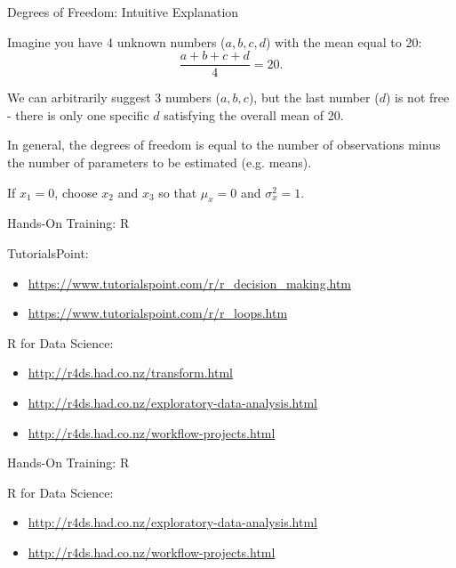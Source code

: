 \begin{frame}{Degrees of Freedom: Intuitive Explanation}
   
    Imagine you have 4 unknown numbers ($a , b , c , d$) with the mean equal to 20:
    \begin{equation*}
    \frac{a + b + c + d}{4} = 20.
    \end{equation*}
    
    We can arbitrarily suggest 3 numbers ($a, b, c$), but the last number ($d$) is not free - there is only one specific $d$ satisfying the overall mean of 20.
    
    In general, the degrees of freedom is equal to the number of observations minus the number of parameters to be estimated (e.g. means).
    
    \begin{example}
        \medskip
        If $x_1 = 0$, choose $x_2$ and $x_3$ so that $\mu_{x} = 0$ and $\sigma^2_{x} = 1$.
    \end{example}
    
\end{frame}

\begin{frame}{Hands-On Training: R}
    
    TutorialsPoint:
    \begin{itemize}
        \item \url{https://www.tutorialspoint.com/r/r_decision_making.htm}
        \item \url{https://www.tutorialspoint.com/r/r_loops.htm}
    \end{itemize}

    R for Data Science:
    \begin{itemize}
        \item \url{http://r4ds.had.co.nz/transform.html}
    \end{itemize}

    \begin{itemize}
        \item \url{http://r4ds.had.co.nz/exploratory-data-analysis.html}
        \item \url{http://r4ds.had.co.nz/workflow-projects.html}
    \end{itemize}

\end{frame}

\begin{frame}{Hands-On Training: R}

    R for Data Science:
    \begin{itemize}
        \item \url{http://r4ds.had.co.nz/exploratory-data-analysis.html}
        \item \url{http://r4ds.had.co.nz/workflow-projects.html}
    \end{itemize}

\end{frame}
